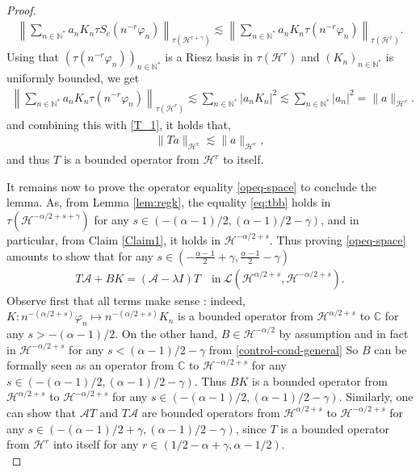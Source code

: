 \documentclass[11pt, dvipsnames]{amsart}
\begin{document}
\begin{proof}
\begin{align*}
     \left\|\sum_{n\in \mathbb{N}^*}a_n K_n \tau S_c(n^{-r}\varphi_n)\right\|_{\tau(\mathcal{H}^{r+\gamma})}\lesssim \left\|\sum_{n\in \mathbb{N}^*}a_n K_n \tau(n^{-r} \varphi_n)\right\|_{\tau(\mathcal{H}^{r})}.
\end{align*}
Using that $(\tau(n^{-r} \varphi_n))_{n\in \mathbb{N}^*}$ is a Riesz basis in $\tau(\mathcal{H}^{r})$ and $(K_{n})_{n\in\mathbb{N}^{*}}$ is uniformly bounded, we get
\begin{align*}
    \left\|\sum_{n\in \mathbb{N}^*}a_n K_n \tau(n^{-r} \varphi_n)\right\|_{\tau(\mathcal{H}^{r})}\lesssim\sum_{n\in \mathbb{N}^*}|a_n K_n|^2\lesssim \sum_{n\in \mathbb{N}^*}|a_n|^2=\|a\|_{\mathcal{H}^r}.
\end{align*}
and combining this with \eqref{T_1}, it holds that,
\begin{align*}
    \|Ta\|_{\mathcal{H}^r}\lesssim \|a\|_{\mathcal{H}^r},
\end{align*}
and thus
$T$ is a bounded operator from $\mathcal{H}^r$ to itself.



    It remains now to prove the operator equality \eqref{opeq-space} to conclude the lemma. As, from Lemma \ref{lem:regk}, the equality \eqref{eq:tbb} holds in 
    $\tau(\mathcal{H}^{-\alpha/2+s+\gamma})$ for any $s\in (-(\alpha-1)/2,(\alpha-1)/2-\gamma)$, and in particular, from Claim \ref{Claim1}, it holds in $\mathcal{H}^{-\alpha/2+s}$.
    Thus proving \eqref{opeq-space} amounts to show that for any $s\in \left(-\frac{\alpha-1}{2}+\gamma,\frac{\alpha-1}{2}-\gamma\right)$
    \begin{align}
     T\mathcal{A}+BK=(\mathcal{A}-\lambda I)T\quad \text{in}\ \mathcal{L}(\mathcal{H}^{\alpha/2+s},\mathcal{H}^{-\alpha/2+s}). \label{opeq-space*}
    \end{align}
    Observe first that all terms make sense : indeed, $K: n^{-(\alpha/2+s)}\varphi_n\mapsto n^{-(\alpha/2+s)}K_n$ is a  bounded operator  from $\mathcal{H}^{\alpha/2+s}$ to $\mathbb{C}$ for any $s> -(\alpha-1)/2$. On the other hand, $B\in \mathcal{H}^{-\alpha/2}$ by assumption and in fact in $\mathcal{H}^{-\alpha/2+s}$ for any $s< (\alpha-1)/2-\gamma$ from \eqref{control-cond-general}
    So $B$ can be formally seen as an operator from $\mathbb{C}$ to $\mathcal{H}^{-\alpha/2+s}$ for any $s\in (-(\alpha-1)/2,(\alpha-1)/2-\gamma)$. Thus $BK$ is a bounded operator from $\mathcal{H}^{\alpha/2+s}$ to $\mathcal{H}^{-\alpha/2+s}$ for any $s\in (-(\alpha-1)/2,(\alpha-1)/2-\gamma).$ Similarly, one can show that $\mathcal{A}T$ and $T\mathcal{A}$ are bounded operators from $\mathcal{H}^{\alpha/2+s}$ to $\mathcal{H}^{-\alpha/2+s}$ for any $s\in (-(\alpha-1)/2+\gamma,(\alpha-1)/2-\gamma)$, 
    since $T$ is a bounded operator from $\mathcal{H}^{r}$ into itself for any $r\in(1/2-\alpha+\gamma, \alpha-1/2)$.\\
    

\end{proof}
\end{document}
